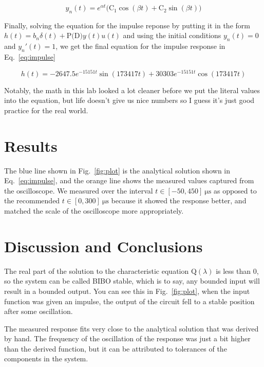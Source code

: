 \documentclass[11pt]{texMemo-gibbons}
\begin{document}
\[
y_n(t)=e^{\alpha t} \big(\text{C}_1  \cos (\beta t) + \text{C}_2 \sin (\beta t) \big) 
\]

Finally, solving the equation for the impulse reponse
by putting it in the form $h(t)=b_n \delta(t) + \text{P(D)}y(t)u(t)$
and using the initial conditions $y_n(t)=0$ and $y_n'(t)=1$,
we get the final equation for the impulse response in
Eq.~\ref{eq:impulse}

\begin{equation}
  \label{eq:impulse}
  h(t)= -2647.5 e^{-15151t} \sin(173417 t) + 30303 e^{-15151t} \cos(173417t)
\end{equation}

Notably, the math in this lab looked a lot cleaner before
we put the literal values into the equation, but life
doesn't give us nice numbers so I guess it's just good
practice for the real world.

\section{Results}
\label{sec:results}

The blue line shown in Fig.~\ref{fig:plot} is the analytical
solution shown in Eq.~\ref{eq:impulse}, and the orange line
shows the measured values captured from the oscilloscope. We 
measured over the interval $t \in [-50, 450]~\si{\us}$ as opposed
to the recommended $t \in [0, 300]~\si{\us}$ because it showed
the response better, and matched the scale of the oscilloscope
more appropriately.


\section{Discussion and Conclusions}
\label{sec:conclusions}

The real part of the solution to the characteristic
equation $\text{Q}(\lambda)$ is less than 0, so the
system can be called BIBO stable, which is to say, any
bounded input will result in a bounded output. You can
see this in Fig.~\ref{fig:plot}, when the input function
was given an impulse, the output of the circuit fell
to a stable position after some oscillation.

The measured response fits very close to the analytical
solution that was derived by hand. The frequency of
the oscillation of the response was just a bit higher
than the derived function, but it can be attributed to 
tolerances of the components in the system.


\clearpage
\end{document}
